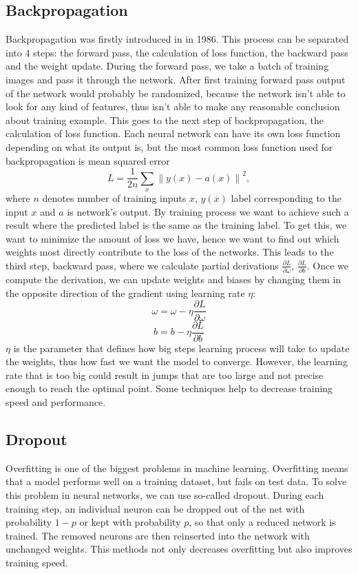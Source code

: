 \documentclass[twoside]{ctuthesis}
\theoremstyle{plain}
\theoremstyle{definition}
\theoremstyle{note}
\newcommand{\norm}[1]{\left\lVert#1\right\rVert}
\begin{document}
\subsection{Backpropagation}
Backpropagation was firstly introduced in\cite{rumelhart_hinton_williams_1986} in 1986. 
This process can be separated into 4 steps: the forward pass, the calculation of loss function, the backward pass and the weight update. During the forward pass, we take a batch of training images and pass it through the network. After first training forward pass output of the network would probably be randomized, because the network isn't able to look for any kind of features, thus isn't able to make any reasonable conclusion about training example.
This goes to the next step of backpropagation, the calculation of loss function.  Each neural network can have its own loss function depending on what its output is, but the most common loss function used for backpropagation is mean squared error
\begin{equation}
L = \frac{1}{2n}\sum_x\norm{y(x) - a(x)}^2      , 
\end{equation}
where $n$ denotes number of training inputs $x$, $y(x)$ label corresponding to the input $x$ and $a$ is network's output.
By training process we want to achieve such a result where the predicted label is the same as the training label. To get this, we want to minimize the amount of loss we have, hence we want to find out which weights most directly contribute to the loss of the networks. This leads to the third step, backward pass, where we calculate partial derivations $\frac{\partial L}{\partial \omega}$, $\frac{\partial L}{\partial b}$. 
Once we compute the derivation, we can update weights and biases by changing them in the opposite direction of the gradient using learning rate $\eta$:
\begin{equation}
\omega = \omega - \eta \frac{\partial L}{\partial \omega}
\end{equation}
\begin{equation}
b = b - \eta \frac{\partial L}{\partial b}
\end{equation}
$\eta$ is the parameter that defines how big steps learning process will take to update the weights, thus how fast we want the model to converge. However, the learning rate that is too big could result in jumps that are too large and not precise enough to reach the optimal point.
Some techniques help to decrease training speed and performance. 
\subsection{Dropout}
Overfitting is one of the biggest problems in machine learning. Overfitting means that a model performs well on a training dataset, but fails on test data. To solve this problem in neural networks, we can use so-called dropout. During each training step, an individual neuron can be dropped out of the net with probability $1 - p$ or kept with probability $p$, so that only a reduced network is trained. The removed neurons are then reinserted into the network with unchanged weights. This methods not only decreases overfitting but also improves training speed. 
\end{document}
